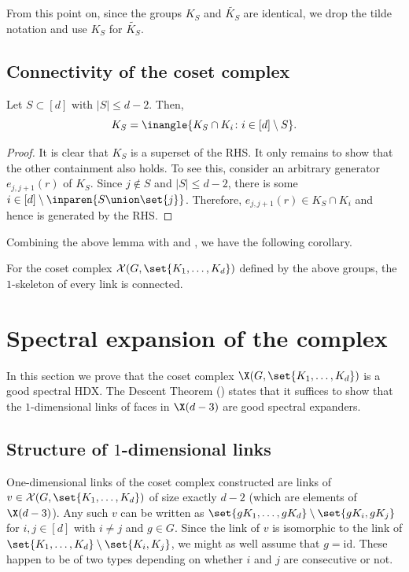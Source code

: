 \documentclass{toc}
\begin{document}
\noindent
From this point on, since the groups $K_S$ and $\widetilde{K_S}$ are identical, we drop the tilde notation and use $K_S$ for $\widetilde{K_S}$. 

\subsection{Connectivity of the coset complex}

\begin{lemma}\label{lem:KS-intersection-property}
  Let $S \subset [d]$ with $|S| \leq d-2$. Then,
  \[
    K_S= \inangle{K_{S} \cap K_i\colon i \in [d] \setminus
      S}. 
  \]
\end{lemma}
\begin{proof}
  It is clear that $K_S$ is a superset of the RHS. It only remains to show that the other containment also holds. To see this, consider an arbitrary generator $e_{j,j+1}(r)$ of $K_S$. Since $j \notin S$ and $|S| \leq d-2$, there is some $i \in [d] \setminus \inparen{S \union \set{j}}$. Therefore, $e_{j,j+1}(r) \in K_S \cap K_i$ and hence is generated by the RHS. 
\end{proof}

\noindent
Combining the above lemma with  and , we have the following corollary.

\begin{corollary}
  For the coset complex $\mathcal{X}(G,\set{K_1,\ldots, K_d})$ defined by the above groups, the $1$-skeleton of every link is connected. 
\end{corollary}

\section{Spectral expansion of the complex}

In this section we prove that the coset complex $\X(G,\set{K_1,\ldots, K_d})$ 
is a good spectral HDX. The
%
Descent Theorem ()  %
states that it suffices to show that the $1$-dimensional links of 
faces in $\X(d-3)$ are good spectral expanders.

\subsection{Structure of $1$-dimensional links}

One-dimensional %
links of the coset complex constructed are links of $v
\in \mathcal{X}(G,\set{K_1,\ldots, K_d})$ of size exactly $d-2$ (which are elements of $\X(d-3)$). Any
such $v$ can be written as $\set{gK_1,\ldots, gK_d} \setminus
\set{gK_{i},gK_{j}}$ for $i,j\in [d]$ with $i \neq j$ and $g \in
G$. Since the link of $v$ is isomorphic to the link of $\set{K_1,\ldots, K_d} \setminus
\set{K_{i},K_{j}}$, we might as well assume that $g=\mathrm{id}$.
These happen to be of two types depending on whether $i$ and $j$ are
consecutive or not. 
\end{document}
